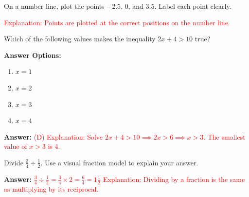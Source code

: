 \documentclass[12pt]{article}
\begin{document}
\begin{tcolorbox}[colframe=black!50, colback=white, title=\textbf{Problem 3 (6.NS.C.6)}]
On a number line, plot the points \(-2.5\), \(0\), and \(3.5\). Label each point clearly.

\begin{center}
\end{center}
\textcolor{red}{Explanation: Points are plotted at the correct positions on the number line.}
\end{tcolorbox}

\begin{tcolorbox}[colframe=black!50, colback=white, title=\textbf{Problem 4 (6.EE.B.5)}]
Which of the following values makes the inequality \(2x + 4 > 10\) true?

\textbf{Answer Options:}
\begin{enumerate}[label=(\Alph*), itemsep=0.5cm]
    \item \(x = 1\)
    \item \(x = 2\)
    \item \(x = 3\)
    \item \(x = 4\)
\end{enumerate}
\textbf{Answer:} \textcolor{red}{(D)}  
\textcolor{red}{Explanation: Solve \(2x + 4 > 10 \implies 2x > 6 \implies x > 3\). The smallest value of \(x > 3\) is 4.}
\end{tcolorbox}

\begin{tcolorbox}[colframe=black!50, colback=white, title=\textbf{Problem 5 (6.NS.A.1)}]
Divide \(\frac{3}{4} \div \frac{1}{2}\). Use a visual fraction model to explain your answer.

\textbf{Answer:} \textcolor{red}{\(\frac{3}{4} \div \frac{1}{2} = \frac{3}{4} \times 2 = \frac{6}{4} = 1\frac{1}{2}\)}  
\textcolor{red}{Explanation: Dividing by a fraction is the same as multiplying by its reciprocal.}
\end{tcolorbox}
\end{document}
